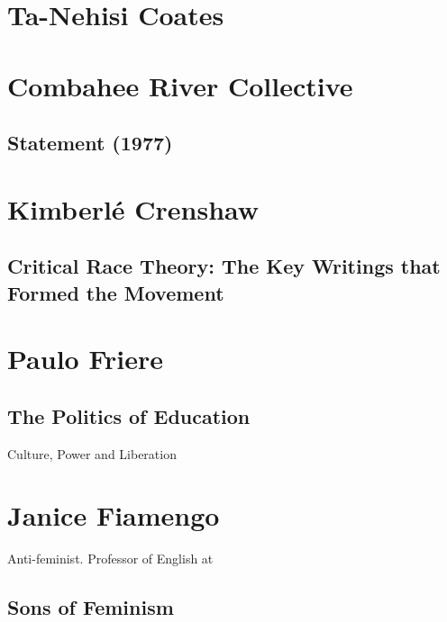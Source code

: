 \documentclass[10pt,titlepage]{book}
\begin{document}
\section{Ta-Nehisi Coates}

\subsection{\cite{coatestnh-bwm,coatestnh-wweyip}}

\section{Combahee River Collective}\label{Combahee}

\subsection{Statement (1977) \cite{combahee-statement}}

\section{Kimberlé Crenshaw}\label{KC}

\subsection{Critical Race Theory: The Key Writings that Formed the Movement \cite{crenshaw1995critical}}

\section{Paulo Friere}\label{Friere}

\subsection{The Politics of Education \cite{friere-poled}}

Culture, Power and Liberation

\section{Janice Fiamengo}\label{Fiameng0}

Anti-feminist.
Professor of English at

\subsection{Sons of Feminism \cite{fiamengo2018sons}}
\end{document}
